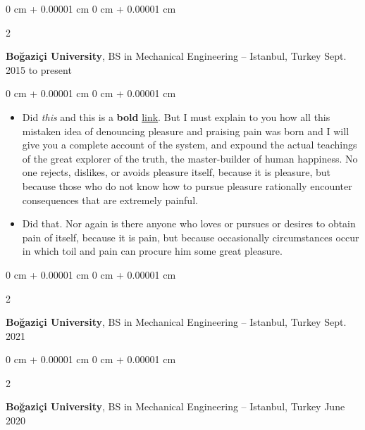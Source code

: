 \documentclass[10pt, letterpaper]{article}
\newenvironment{highlights}{
    \begin{itemize}[
        topsep=0.10 cm,
        parsep=0.10 cm,
        partopsep=0pt,
        itemsep=0pt,
        leftmargin=0 cm + 10pt
    ]
}{
    \end{itemize}
} %
\newenvironment{onecolentry}{
    \begin{adjustwidth}{
        0 cm + 0.00001 cm
    }{
        0 cm + 0.00001 cm
    }
}{
    \end{adjustwidth}
} %
\newenvironment{twocolentry}[2][]{
    \onecolentry
    \def\secondColumn{#2}
    \setcolumnwidth{\fill, 4.5 cm}
    \begin{paracol}{2}
}{
    \switchcolumn \raggedleft \secondColumn
    \end{paracol}
    \endonecolentry
} %
\begin{document}
        \begin{twocolentry}{
            Sept. 2015 to present
        }
            \textbf{Boğaziçi University}, BS in Mechanical Engineering -- Istanbul, Turkey\end{twocolentry}

        \vspace{0.10 cm}
        \begin{onecolentry}
            \begin{highlights}
                \item Did \textit{this} and this is a \textbf{bold} \href{https://example.com}{link}. But I must explain to you how all this mistaken idea of denouncing pleasure and praising pain was born and I will give you a complete account of the system, and expound the actual teachings of the great explorer of the truth, the master-builder of human happiness. No one rejects, dislikes, or avoids pleasure itself, because it is pleasure, but because those who do not know how to pursue pleasure rationally encounter consequences that are extremely painful.
                \item Did that. Nor again is there anyone who loves or pursues or desires to obtain pain of itself, because it is pain, but because occasionally circumstances occur in which toil and pain can procure him some great pleasure.
            \end{highlights}
        \end{onecolentry}


        \vspace{0.2 cm}

        \begin{twocolentry}{
            Sept. 2021
        }
            \textbf{Boğaziçi University}, BS in Mechanical Engineering -- Istanbul, Turkey\end{twocolentry}



        \vspace{0.2 cm}

        \begin{twocolentry}{
            June 2020
        }
            \textbf{Boğaziçi University}, BS in Mechanical Engineering -- Istanbul, Turkey\end{twocolentry}
\end{document}
